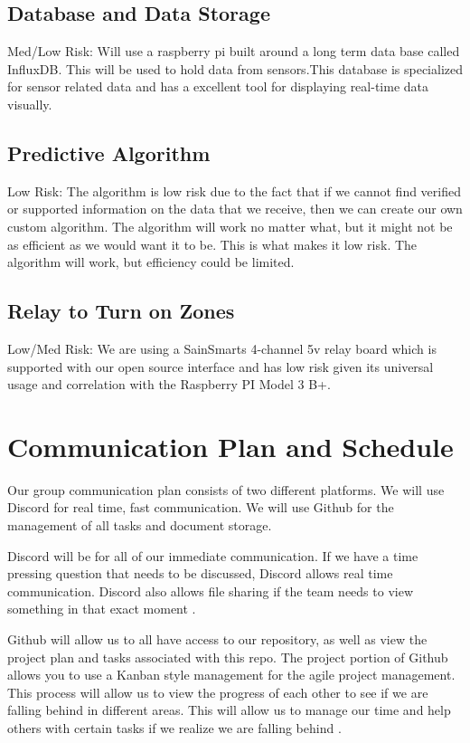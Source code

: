 \documentclass[letterpaper, 10 pt, conference]{ieeeconf}  %
\begin{document}
\subsection{Database and Data Storage}
Med/Low Risk: Will use a raspberry pi built around a long term data base called InfluxDB. This will be used to hold data from sensors.This database is specialized for sensor related data and has a excellent tool for displaying real-time data visually.

\subsection{Predictive Algorithm}
Low Risk: The algorithm is low risk due to the fact that if we cannot find verified or supported information on the data that we receive, then we can create our own custom algorithm. The algorithm will work no matter what, but it might not be as efficient as we would want it to be. This is what makes it low risk. The algorithm will work, but efficiency could be limited.

\subsection{Relay to Turn on Zones}
Low/Med Risk: We are using a SainSmarts 4-channel 5v relay board which is supported with our open source interface and has low risk given its universal usage and correlation with the Raspberry PI Model 3 B+.

\section{Communication Plan and Schedule}
Our group communication plan consists of two different platforms. We will use Discord for real time, fast communication. We will use Github for the management of all tasks and document storage. 

Discord will be for all of our immediate communication. If we have a time pressing question that needs to be discussed, Discord allows real time communication. Discord also allows file sharing if the team needs to view something in that exact moment \cite{discord}.

Github will allow us to all have access to our repository, as well as view the project plan and tasks associated with this repo. The project portion of Github allows you to use a Kanban style management for the agile project management. This process will allow us to view the progress of each other to see if we are falling behind in different areas. This will allow us to manage our time and help others with certain tasks if we realize we are falling behind \cite{github}. 
\end{document}
